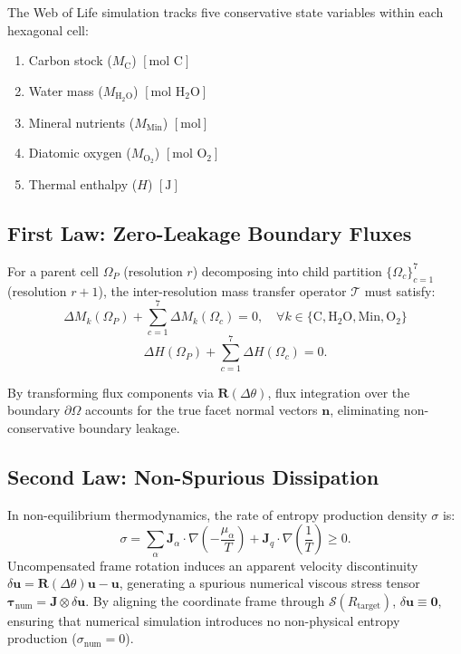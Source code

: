 \documentclass[10pt,journal,compsoc]{IEEEtran}
\begin{document}
The Web of Life simulation tracks five conservative state variables within each hexagonal cell:
\begin{enumerate}
    \item Carbon stock ($M_{\text{C}}$) $[\text{mol C}]$
    \item Water mass ($M_{\text{H}_2\text{O}}$) $[\text{mol H}_2\text{O}]$
    \item Mineral nutrients ($M_{\text{Min}}$) $[\text{mol}]$
    \item Diatomic oxygen ($M_{\text{O}_2}$) $[\text{mol O}_2]$
    \item Thermal enthalpy ($H$) $[\text{J}]$
\end{enumerate}

\subsection{First Law: Zero-Leakage Boundary Fluxes}
For a parent cell $\Omega_P$ (resolution $r$) decomposing into child partition $\{\Omega_{c}\}_{c=1}^7$ (resolution $r+1$), the inter-resolution mass transfer operator $\mathcal{T}$ must satisfy:
\begin{equation}
\Delta M_k(\Omega_P) + \sum_{c=1}^7 \Delta M_k(\Omega_c) = 0, \quad \forall k \in \{\text{C}, \text{H}_2\text{O}, \text{Min}, \text{O}_2\}
\end{equation}
\begin{equation}
\Delta H(\Omega_P) + \sum_{c=1}^7 \Delta H(\Omega_c) = 0.
\end{equation}

By transforming flux components via $\mathbf{R}(\Delta \theta)$, flux integration over the boundary $\partial \Omega$ accounts for the true facet normal vectors $\mathbf{n}$, eliminating non-conservative boundary leakage.

\subsection{Second Law: Non-Spurious Dissipation}
In non-equilibrium thermodynamics, the rate of entropy production density $\sigma$ is:
\begin{equation}
\sigma = \sum_{\alpha} \mathbf{J}_{\alpha} \cdot \nabla \left(-\frac{\mu_{\alpha}}{T}\right) + \mathbf{J}_q \cdot \nabla \left(\frac{1}{T}\right) \ge 0.
\end{equation}
Uncompensated frame rotation induces an apparent velocity discontinuity $\delta \mathbf{u} = \mathbf{R}(\Delta \theta)\mathbf{u} - \mathbf{u}$, generating a spurious numerical viscous stress tensor $\boldsymbol{\tau}_{\text{num}} = \mathbf{J} \otimes \delta \mathbf{u}$. By aligning the coordinate frame through $\mathcal{S}(R_{\text{target}})$, $\delta \mathbf{u} \equiv \mathbf{0}$, ensuring that numerical simulation introduces no non-physical entropy production ($\sigma_{\text{num}} = 0$).
\end{document}
